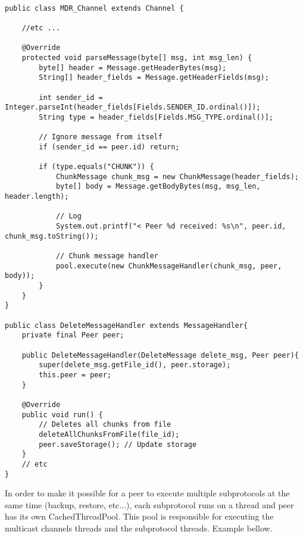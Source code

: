 \documentclass[11pt]{report}
\begin{document}
\begin{verbatim}

public class MDR_Channel extends Channel {

    //etc ...

    @Override
    protected void parseMessage(byte[] msg, int msg_len) {
        byte[] header = Message.getHeaderBytes(msg);
        String[] header_fields = Message.getHeaderFields(msg);

        int sender_id = Integer.parseInt(header_fields[Fields.SENDER_ID.ordinal()]);
        String type = header_fields[Fields.MSG_TYPE.ordinal()];

        // Ignore message from itself
        if (sender_id == peer.id) return;

        if (type.equals("CHUNK")) {
            ChunkMessage chunk_msg = new ChunkMessage(header_fields);
            byte[] body = Message.getBodyBytes(msg, msg_len, header.length);
            
            // Log
            System.out.printf("< Peer %d received: %s\n", peer.id, chunk_msg.toString());
            
            // Chunk message handler
            pool.execute(new ChunkMessageHandler(chunk_msg, peer, body));
        }
    }
}

public class DeleteMessageHandler extends MessageHandler{
    private final Peer peer;

    public DeleteMessageHandler(DeleteMessage delete_msg, Peer peer){
        super(delete_msg.getFile_id(), peer.storage);
        this.peer = peer;
    }

    @Override
    public void run() {
        // Deletes all chunks from file
        deleteAllChunksFromFile(file_id);
        peer.saveStorage(); // Update storage
    }
    // etc
}
\end{verbatim}

In order to make it possible for a peer to execute multiple subprotocols at the same time (backup, restore, etc...), each subprotocol runs on a thread and peer has its own CachedThreadPool. This pool is responsible for executing the multicast channels threads and the subprotocol threads. Example bellow.
\end{document}
